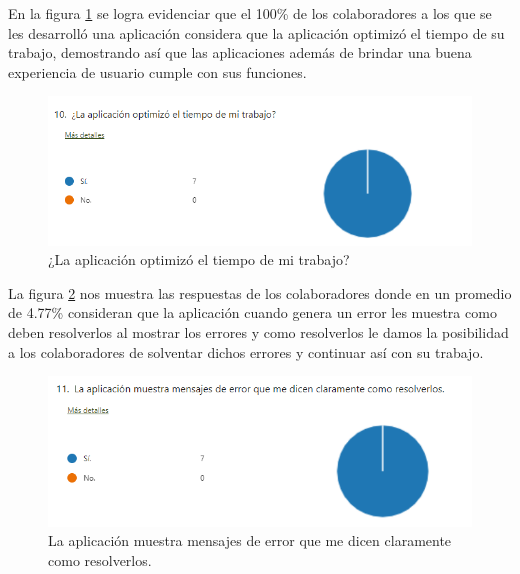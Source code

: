 En la figura \ref{fig:tiempodetra} se logra evidenciar que el 100\% de los colaboradores a los que se les desarrolló una aplicación considera que la aplicación optimizó el tiempo de su trabajo, demostrando así que las aplicaciones además de brindar una buena experiencia de usuario cumple con sus funciones.

\begin{figure}[H]
	\centering
	\includegraphics[scale=0.5]{Capitulo5/imagenes/11}
	\caption{¿La aplicación optimizó el tiempo de mi trabajo?}
	\label{fig:tiempodetra}
\end{figure}

La figura \ref{fig:errorsmen} nos muestra las respuestas de los colaboradores donde en un promedio de 4.77\% consideran que la aplicación cuando genera un error les muestra como deben resolverlos al mostrar los errores y como resolverlos le damos la posibilidad a los colaboradores de solventar dichos errores y continuar así con su trabajo.
\begin{figure}[H]
	\centering
	\includegraphics[scale=0.5]{Capitulo5/imagenes/12}
	\caption{La aplicación muestra mensajes de error que me dicen claramente como resolverlos.}
	\label{fig:errorsmen}
\end{figure}

